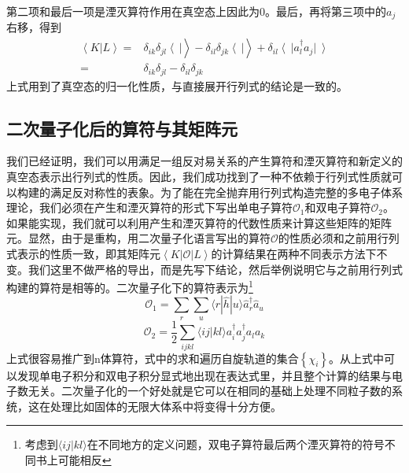 \documentclass[12pt,a4paper,openany,twoside]{book}
\numberwithin{equation}{section}
\begin{document}
      第二项和最后一项是湮灭算符作用在真空态上因此为0。最后，再将第三项中的$a_j$右移，得到
      \begin{equation}
          \begin{aligned}
              \left\langle K\right|\left.L\right\rangle=&\delta_{ik}\delta_{jl}\left\langle\ \right|\left.\right\rangle
              -\delta_{il}\delta_{jk} \left\langle\ \right|\left.\right\rangle
              +\delta_{il}\left\langle\ \right|a_l^\dagger a_j\left|\ \right\rangle\\
              =&\delta_{ik}\delta_{jl}-\delta_{il}\delta_{jk} 
          \end{aligned}
      \end{equation}
      上式用到了真空态的归一化性质，与直接展开行列式的结论是一致的。
      
    \subsection{二次量子化后的算符与其矩阵元}
      
      我们已经证明，我们可以用满足一组反对易关系的产生算符和湮灭算符和新定义的真空态表示出行列式的性质。因此，我们成功找到了一种不依赖于行列式性质就可以构建的满足反对称性的表象。为了能在完全抛弃用行列式构造完整的多电子体系理论，我们必须在产生和湮灭算符的形式下写出单电子算符$\mathcal{O}_1$和双电子算符$\mathcal{O}_2$。如果能实现，我们就可以利用产生和湮灭算符的代数性质来计算这些矩阵的矩阵元。显然，由于是重构，用二次量子化语言写出的算符$\mathcal{O}$的性质必须和之前用行列式表示的性质一致，即其矩阵元$\left\langle K\right|\mathcal{O}\left|L\right\rangle$的计算结果在两种不同表示方法下不变。我们这里不做严格的导出，而是先写下结论，然后举例说明它与之前用行列式构建的算符是相等的。二次量子化下的算符表示为\footnote{考虑到$\langle i j | k l\rangle$在不同地方的定义问题，双电子算符最后两个湮灭算符的符号不同书上可能相反}
      \begin{equation}
          \mathcal{O}_1=\sum_{r} \sum_{u}\langle r|\hat{h}| u\rangle \hat{a}_{r}^{\dagger} \hat{a}_{u}
      \end{equation}
      \begin{equation}
        \mathcal{O}_{2}=\frac{1}{2} \sum_{i j k l}\langle i j | k l\rangle a_{i}^{\dagger} a_{j}^{\dagger} a_{l} a_{k}
      \end{equation}
      上式很容易推广到n体算符，式中的求和遍历自旋轨道的集合$\left\{\chi_i\right\}$。从上式中可以发现单电子积分和双电子积分显式地出现在表达式里，并且整个计算的结果与电子数无关。二次量子化的一个好处就是它可以在相同的基础上处理不同粒子数的系统，这在处理比如固体的无限大体系中将变得十分方便。
      
\end{document}
